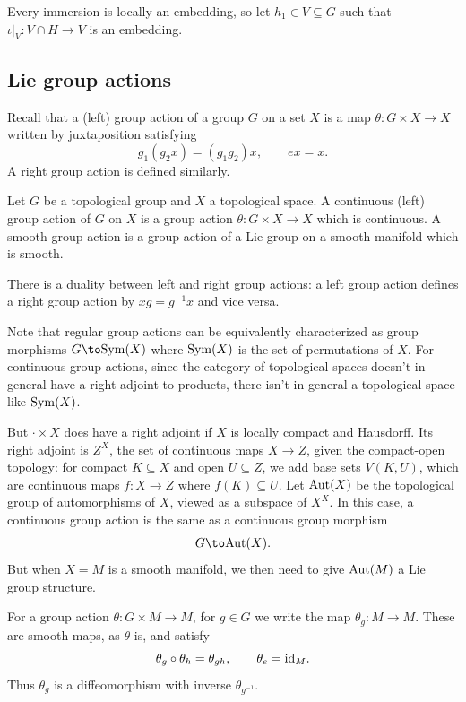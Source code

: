     Every immersion is locally an embedding, so let $h_1\in V\subseteq G$ such that $\iota|_V\colon V\cap H\to V$ is an embedding.

\eproof


\subsection{Lie group actions}

Recall that a (left) group action of a group $G$ on a set $X$ is a map $\theta\colon G\times X\to X$ written by juxtaposition satisfying
$$ g_1(g_2x) = (g_1g_2)x,\qquad ex = x . $$
A right group action is defined similarly.

\bdefn

    Let $G$ be a topological group and $X$ a topological space.
    A {\emphcolor continuous (left) group action} of $G$ on $X$ is a group action $\theta\colon G\times X\to X$ which is continuous.
    A {\emphcolor smooth group action} is a group action of a Lie group on a smooth manifold which is smooth.

\edefn

There is a duality between left and right group actions: a left group action defines a right group action by $xg=g^{-1}x$ and vice versa.

Note that regular group actions can be equivalently characterized as group morphisms $G\to\sym(X)$ where ${\rm Sym}(X)$ is the set of permutations of $X$.
For continuous group actions, since the category of topological spaces doesn't in general have a right adjoint to products, there isn't in general
a topological space like ${\rm Sym}(X)$.

But $\cdot\times X$ does have a right adjoint if $X$ is locally compact and Hausdorff.
Its right adjoint is $Z^X$, the set of continuous maps $X\to Z$, given the compact-open topology: for compact $K\subseteq X$ and open $U\subseteq Z$,
we add base sets $V(K,U)$, which are continuous maps $f\colon X\to Z$ where $f(K)\subseteq U$.
Let ${\rm Aut}(X)$ be the topological group of automorphisms of $X$, viewed as a subspace of $X^X$.
In this case, a continuous group action is the same as a continuous group morphism
$$ G \to \aut(X) . $$
But when $X=M$ is a smooth manifold, we then need to give ${\rm Aut}(M)$ a Lie group structure.

For a group action $\theta\colon G\times M\to M$, for $g\in G$ we write the map $\theta_g\colon M\to M$.
These are smooth maps, as $\theta$ is, and satisfy
$$ \theta_g\circ\theta_h = \theta_{gh},\qquad \theta_e={\rm id}_M . $$
Thus $\theta_g$ is a diffeomorphism with inverse $\theta_{g^{-1}}$.

